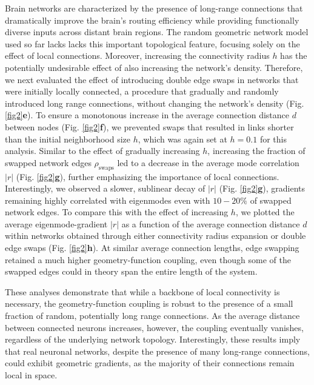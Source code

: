 \documentclass{article}
\begin{document}
Brain networks are characterized by the presence of long-range connections that dramatically improve the brain's routing efficiency while providing functionally diverse inputs across distant brain regions\cite{betzel2018specificity}. The random geometric network model used so far lacks lacks this important topological feature, focusing solely on the effect of local connections. Moreover, increasing the connectivity radius $h$ has the potentially undesirable effect of also increasing the network's density. Therefore, we next evaluated the effect of introducing double edge swaps in networks that were initially locally connected, a procedure that gradually and randomly introduced long range connections, without changing the network's density (Fig. \ref{fig2}\textbf{e}). To ensure a monotonous increase in the average connection distance $d$ between nodes (Fig. \ref{fig2}\textbf{f}), we prevented swaps that resulted in links shorter than the initial neighborhood size $h$, which was again set at $h=0.1$ for this analysis. Similar to the effect of gradually increasing $h$, increasing the fraction of swapped network edges $\rho_{\text{swaps}}$ led to a decrease in the average mode correlation $|r|$ (Fig. \ref{fig2}\textbf{g}), further emphasizing the importance of local connections. Interestingly, we observed a slower, sublinear decay of $|r|$ (Fig. \ref{fig2}\textbf{g}), gradients remaining highly correlated with eigenmodes even with $10-20\%$ of swapped network edges. To compare this with the effect of increasing $h$, we plotted the average eigenmode-gradient $|r|$ as a function of the average connection distance $d$ within networks obtained through either connectivity radius expansion or double edge swaps (Fig. \ref{fig2}\textbf{h}). At similar average connection lengths, edge swapping retained a much higher geometry-function coupling, even though some of the swapped edges could in theory span the entire length of the system. 

These analyses demonstrate that while a backbone of local connectivity is necessary, the geometry-function coupling is robust to the presence of a small fraction of random, potentially long range connections. As the average distance between connected neurons increases, however, the coupling eventually vanishes, regardless of the underlying network topology. Interestingly, these results imply that real neuronal networks, despite the presence of many long-range connections, could exhibit geometric gradients, as the majority of their connections remain local in space\cite{ercsey2013predictive}.
\end{document}
